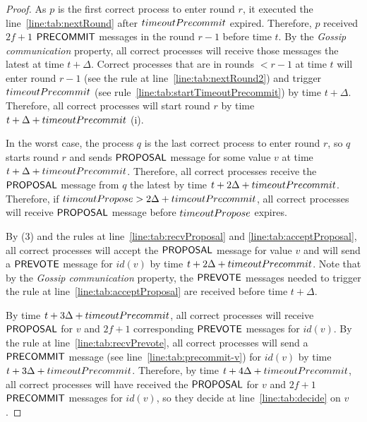 \begin{proof} As $p$ is the first correct process to enter round $r$, it
    executed the line~\ref{line:tab:nextRound} after $timeoutPrecommit$
    expired. Therefore, $p$ received $2f+1$ $\mathsf{PRECOMMIT}$ messages in the round
    $r-1$ before time $t$. By the \emph{Gossip communication} property, all
    correct processes will receive those messages the latest at time $t +
    \Delta$. Correct processes that are in rounds $< r-1$ at time $t$ will
    enter round $r-1$ (see the rule at line~\ref{line:tab:nextRound2}) and
    trigger $timeoutPrecommit$ (see rule~\ref{line:tab:startTimeoutPrecommit})
    by time $t+\Delta$. Therefore, all correct processes will start round $r$
    by time $t+\Delta+timeoutPrecommit$ (i).
 
In the worst case, the process $q$ is the last correct process to enter round
$r$, so $q$ starts round $r$ and sends $\mathsf{PROPOSAL}$ message for some value $v$
at time $t + \Delta + timeoutPrecommit$. Therefore, all correct processes
receive the $\mathsf{PROPOSAL}$ message from $q$ the latest by time $t + 2\Delta +
timeoutPrecommit$. Therefore, if $timeoutPropose > 2\Delta +
timeoutPrecommit$, all correct processes will receive $\mathsf{PROPOSAL}$ message
before $timeoutPropose$ expires. 

By (3) and the rules at line~\ref{line:tab:recvProposal} and
\ref{line:tab:acceptProposal}, all correct processes will accept the
$\mathsf{PROPOSAL}$ message for value $v$ and will send a $\mathsf{PREVOTE}$ message for
$id(v)$ by time $t + 2\Delta + timeoutPrecommit$.  Note that by the
\emph{Gossip communication} property, the $\mathsf{PREVOTE}$ messages needed to trigger
the rule at line~\ref{line:tab:acceptProposal} are received before time $t +
\Delta$.  

By time $t + 3\Delta + timeoutPrecommit$, all correct processes will receive
$\mathsf{PROPOSAL}$ for $v$ and $2f+1$ corresponding $\mathsf{PREVOTE}$ messages for $id(v)$.
By the rule at line~\ref{line:tab:recvPrevote}, all correct processes will send
a $\mathsf{PRECOMMIT}$ message (see line~\ref{line:tab:precommit-v}) for $id(v)$ by
time $t + 3\Delta + timeoutPrecommit$. Therefore, by time $t + 4\Delta +
timeoutPrecommit$, all correct processes will have received the $\mathsf{PROPOSAL}$
for $v$ and $2f+1$ $\mathsf{PRECOMMIT}$ messages for $id(v)$, so they decide at
line~\ref{line:tab:decide} on $v$. 


\end{proof}
